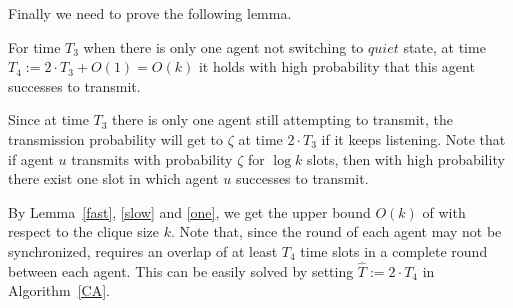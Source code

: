 Finally we need to prove the following lemma.
\begin{lemma}
    \label{one}
    For time $T_3$ when there is only one agent not switching to $quiet$ state,
    at time $T_4 := 2 \cdot T_3 + O(1) = O(k)$ it holds with high 
    probability that this agent successes to transmit.
\end{lemma}

\begin{IEEEproof}
    Since at time $T_3$ there is only one agent still attempting to transmit,
    the transmission probability will get to $\zeta$ at time $2\cdot T_3$ if it keeps
    listening. Note that if agent $u$ transmits with probability $\zeta$ for $\log k$ slots, 
    then with high probability there exist one slot in which agent $u$ successes to transmit.
\end{IEEEproof}

By Lemma~\ref{fast}, \ref{slow} and \ref{one},
we get the upper bound $O(k)$ of {\pName} with respect to
the clique size $k$. Note that, since the round of each agent may not be 
synchronized, {\pName} requires an overlap of at least $T_4$ time 
slots in a complete round between each agent.
This can be easily solved by setting $\hat{T} := 2\cdot T_4$ in Algorithm~\ref{CA}. 




